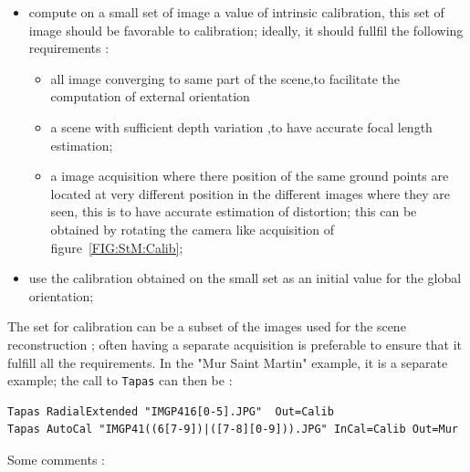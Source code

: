 \begin{itemize}
   \item  compute on a small set of image a value of intrinsic calibration,
          this set of image should be favorable to calibration; ideally,
          it should fullfil the following requirements :

\begin{itemize}
  \item  all image converging  to same part of the scene,to facilitate the computation 
         of external  orientation 

   \item  a scene with sufficient depth variation ,to have accurate focal length estimation;

   \item  a image acquisition where there position of the same ground points are located at
          very different position in the different images where they are seen, this is to
          have accurate estimation of distortion; this can be obtained by rotating the camera
          like acquisition of figure~\ref{FIG:StM:Calib};

\end{itemize}
   \item  use the calibration obtained on the small set as an initial value for
          the global orientation;
\end{itemize}


The set for calibration can be a subset of the images used for the scene
reconstruction ; often having a separate acquisition  is preferable to
ensure that it fulfill all the requirements.
In the "Mur Saint Martin"  example, it is
a separate example;  the call to {\tt Tapas} can then be :


\begin{verbatim}
Tapas RadialExtended "IMGP416[0-5].JPG"  Out=Calib
Tapas AutoCal "IMGP41((6[7-9])|([7-8][0-9])).JPG" InCal=Calib Out=Mur
\end{verbatim}

Some comments :

